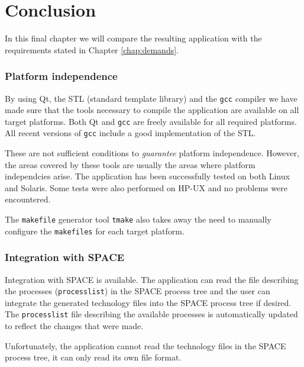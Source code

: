
\chapter{Conclusion}\label{chap:conclusion}
In this final chapter we will compare the resulting application with the
requirements stated in Chapter \ref{chap:demands}.

\subsection*{Platform independence}
By using Qt, the STL (standard template library) and the \verb=gcc= compiler we
have made sure that the tools necessary to compile the application are
available on all target platforms. Both Qt and \verb=gcc= are freely available
for all required platforms. All recent versions of \verb=gcc= include a good
implementation of the STL.

These are not sufficient conditions to \emph{guarantee} platform independence.
However, the areas covered by these tools are usually the areas where platform
independcies arise. The application has been successfully tested on both Linux
and Solaris. Some tests were also performed on HP-UX and no problems were
encountered.

The \verb=makefile= generator tool \verb=tmake= also takes away the need to
manually configure the \verb=makefiles= for each target platform.

\subsection*{Integration with SPACE}
Integration with SPACE is available. The application can read the file
describing the processes (\verb=processlist=) in the SPACE process tree and the
user can integrate the generated technology files into the SPACE process tree
if desired. The \verb=processlist= file describing the available processes is
automatically updated to reflect the changes that were made.

Unfortunately, the application cannot read the technology files in the SPACE
process tree, it can only read its own file format.

